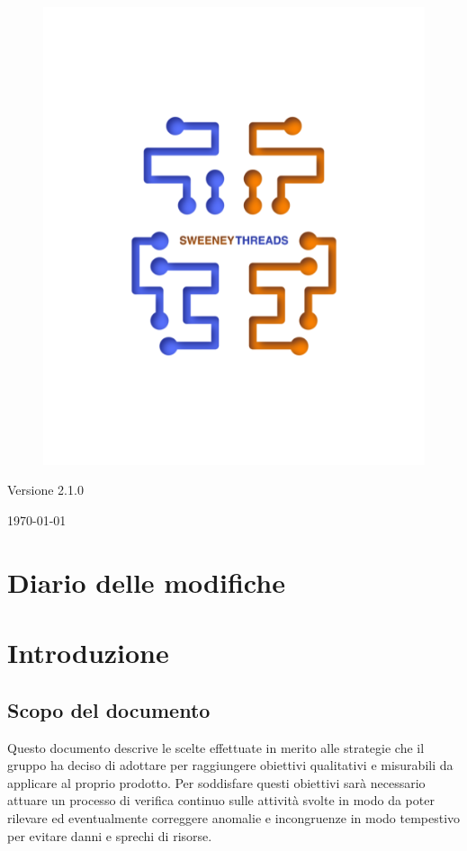 \documentclass[a4paper]{article}
\begin{document}
\begin{titlepage}
		\begin{figure}[H]
			\centering
			\includegraphics[scale=0.8]{sweeney.png}
		\end{figure}
		\begin{center}
			Versione 2.1.0
		\end{center}
		{\large \today}\\[3cm] 
		\vfill  
	\end{titlepage}
	
	\tableofcontents
	\newpage
	\section*{Diario delle modifiche}
     
	\newpage
    \section{Introduzione}
		\subsection{Scopo del documento}
			Questo documento descrive le scelte effettuate in merito alle strategie 
			che il gruppo ha deciso di adottare per raggiungere obiettivi qualitativi e misurabili da 
			applicare al proprio prodotto. Per soddisfare questi obiettivi sarà necessario attuare un 
			processo di verifica continuo sulle attività svolte in modo da poter rilevare ed eventualmente 
			correggere anomalie e incongruenze in modo tempestivo per evitare danni e sprechi di risorse.
\end{document}
